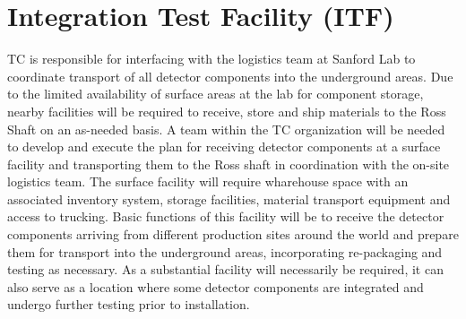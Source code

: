 \section{Integration Test Facility (ITF)}
\label{sec:fdsp-coord-integ-test}

 TC is responsible for interfacing with the  
logistics team at Sanford Lab to coordinate transport of all detector
components into the underground areas.  Due to the limited availability 
of surface areas at the lab for component storage, nearby facilities 
will be required to receive, store and ship materials to the Ross Shaft 
on an as-needed basis. A team within the TC organization will be needed 
to develop and execute the plan for receiving detector components at a 
surface facility and transporting them to the Ross shaft in coordination 
with the on-site  logistics team.  The surface facility will 
require wharehouse space with an associated inventory system, storage 
facilities, material transport equipment and access to trucking.  Basic 
functions of this facility will be to receive the detector components 
arriving from different production sites around the world and prepare 
them for transport into the underground areas, incorporating re-packaging 
and testing as necessary. As a substantial facility will necessarily be 
required, it can also serve as a location where some detector components 
are integrated and undergo further testing prior to installation.  

